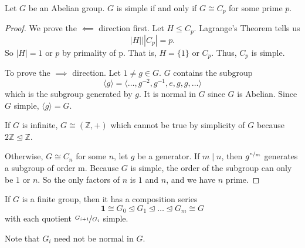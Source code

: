 \begin{lemma}
    Let \(G\) be an Abelian group. \(G\) is simple if and only if \(G \cong C_p\) for some prime \(p\).
\end{lemma}
\begin{proof}
    We prove the \(\impliedby \) direction first. Let \(H \leq C_p\). Lagrange's Theorem tells us
    \[
        \left\vert H \right\vert \big\vert \left\vert C_p \right\vert = p.
    \]
    So \(\left\vert H \right\vert = 1\) or \(p\) by primality of p. That is, \(H = \{1\}\) or \(C_p\). Thus, \(C_p\) is simple.

    To prove the \(\implies\) direction. Let \(1 \neq g \in G\). \(G\) contains the subgroup
    \[
        \langle g\rangle = \langle\ldots ,g^{-2},g^{-1},e,g,g, \ldots\rangle 
    \]
    which is the subgroup generated by \(g\). It is normal in \(G\) since \(G\) is Abelian. Since \(G\) simple, \(\langle g\rangle = G\).

    If \(G\) is infinite, \(G \cong (\mathbb{Z}, +)\) which cannot be true by simplicity of \(G\) because \(2\mathbb{Z}\trianglelefteq \mathbb{Z}\).

    Otherwise, \(G \cong C_n\) for some \(n\), let \(g\) be a generator. If \(m\mid n\), then \(g^{\nicefrac{n}{m}}\) generates a subgroup of order m. Because \(G\) is simple, the order of the subgroup can only be \(1\) or \(n\). So the only factors of \(n\) is \(1\) and \(n\), and we have \(n\) prime.
\end{proof}
\begin{lemma}
    If \(G\) is a finite group, then it has a composition series
    \[
        \textbf{1} \cong G_0 \trianglelefteq G_1 \trianglelefteq \ldots \trianglelefteq G_m \cong G
    \]
    with each quotient \(\nicefrac{G_{i+1}}{G_{i}}\) simple.

    Note that \(G_i\) need not be normal in \(G\).
\end{lemma}